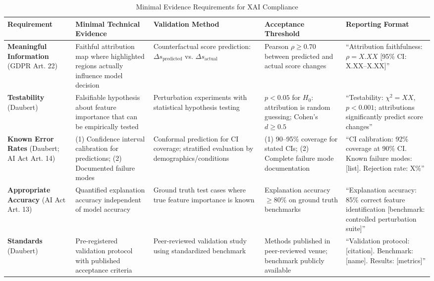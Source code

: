 \newpage

\begin{landscape}
\begin{table}[h]
\centering
\caption{Minimal Evidence Requirements for XAI Compliance}
\label{tab:minimal-evidence}
\scriptsize
\begin{tabular}{@{}p{3cm}p{3.5cm}p{3cm}p{2.5cm}p{3cm}@{}}
\toprule
\textbf{Requirement} & \textbf{Minimal Technical Evidence} & \textbf{Validation Method} & \textbf{Acceptance Threshold} & \textbf{Reporting Format} \\
\midrule
\textbf{Meaningful Information} (GDPR Art. 22) &
Faithful attribution map where highlighted regions actually influence model decision &
Counterfactual score prediction: $\Delta s_{\text{predicted}}$ vs. $\Delta s_{\text{actual}}$ &
Pearson $\rho \geq 0.70$ between predicted and actual score changes &
``Attribution faithfulness: $\rho = X.XX$ [95\% CI: X.XX--X.XX]'' \\
\addlinespace
\textbf{Testability} (Daubert) &
Falsifiable hypothesis about feature importance that can be empirically tested &
Perturbation experiments with statistical hypothesis testing &
$p < 0.05$ for $H_0$: attribution is random guessing; Cohen's $d \geq 0.5$ &
``Testability: $\chi^2 = XX$, $p < 0.001$; attributions significantly predict score changes'' \\
\addlinespace
\textbf{Known Error Rates} (Daubert; AI Act Art. 14) &
(1) Confidence interval calibration for predictions; (2) Documented failure modes &
Conformal prediction for CI coverage; stratified evaluation by demographics/conditions &
(1) 90--95\% coverage for stated CIs; (2) Complete failure mode documentation &
``CI calibration: 92\% coverage at 90\% CI. Known failure modes: [list]. Rejection rate: X\%'' \\
\addlinespace
\textbf{Appropriate Accuracy} (AI Act Art. 13) &
Quantified explanation accuracy independent of model accuracy &
Ground truth test cases where true feature importance is known &
Explanation accuracy $\geq 80\%$ on ground truth benchmarks &
``Explanation accuracy: 85\% correct feature identification [benchmark: controlled perturbation suite]'' \\
\addlinespace
\textbf{Standards} (Daubert) &
Pre-registered validation protocol with published acceptance criteria &
Peer-reviewed validation study using standardized benchmark &
Methods published in peer-reviewed venue; benchmark publicly available &
``Validation protocol: [citation]. Benchmark: [name]. Results: [metrics]'' \\

\end{tabular}
\end{table}
\end{landscape}
